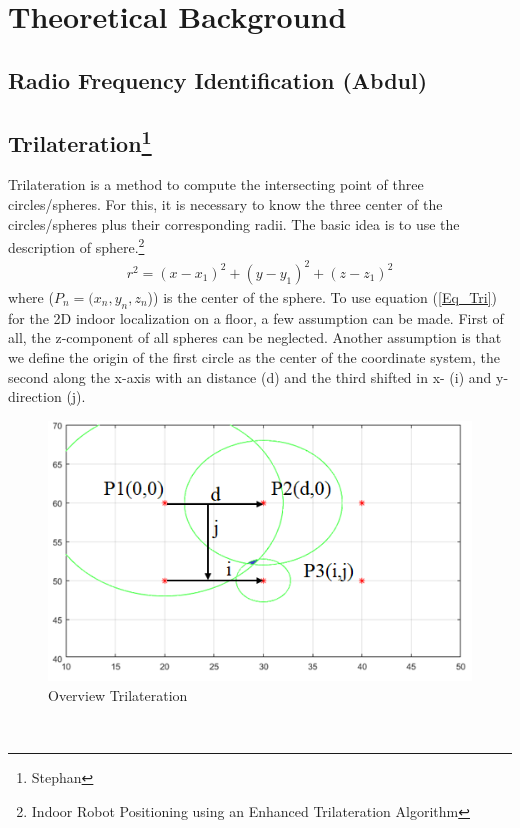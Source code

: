 \section{Theoretical Background} 

\subsection{Radio Frequency Identification (Abdul) }

\subsection[Trilateration]{Trilateration\footnote{Stephan}}
Trilateration is a method to compute the intersecting point of three circles/spheres. For this, it is necessary to know the three center of the circles/spheres plus their corresponding radii. The basic idea is to use the description of sphere.\footnote{Indoor Robot Positioning using an Enhanced Trilateration Algorithm} 
\begin{align}\label{Eq_Tri}
r^2 = (x-x_1)^2 + (y-y_1)^2 + (z-z_1)^2  
\end{align} 
where ($P_n=(x_n,y_n,z_n$)) is the center of the sphere. To use equation (\ref{Eq_Tri}) for the 2D indoor localization on a floor, a few assumption can be made. First of all, the z-component of all spheres can be neglected. Another assumption is that we define the origin of the first circle as the center of the coordinate system, the second along the x-axis with an distance (d) and the third shifted in x- (i) and y-direction (j). 
\begin{figure}[!htbp]
 \centering
 \includegraphics[width = 13cm]{Pictures/Trilateration_1}
 \caption{Overview Trilateration}
 \label{Tri_1}
 \end{figure}\\ 
